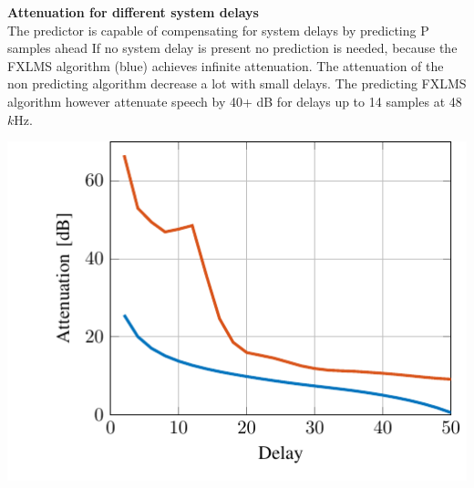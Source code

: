 \begin{minipage}{.5\columnwidth}
	\textbf{Attenuation for different system delays}\\
	The predictor is capable of compensating for system delays by predicting P samples ahead	 If no system delay is present no prediction is needed, because the FXLMS algorithm (blue) achieves infinite attenuation. The attenuation of the non predicting algorithm decrease a lot with small delays. The predicting FXLMS algorithm however attenuate speech by 40+ dB for delays up to 14 samples at 48 $k$Hz.
\end{minipage}%
\begin{minipage}{0.5\columnwidth}
	\includegraphics[width=\textwidth]{figures/DelayRatio.pdf}
\end{minipage}

